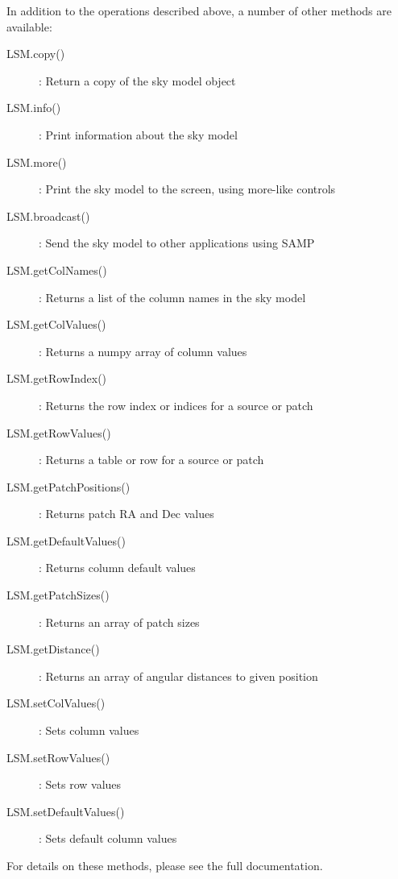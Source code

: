 \documentclass[structabstract]{article}
\begin{document}
In addition to the operations described above, a number of other methods are available:
\begin{description}
 \item[LSM.copy()]: Return a copy of the sky model object
 \item[LSM.info()]: Print information about the sky model
 \item[LSM.more()]: Print the sky model to the screen, using more-like controls
 \item[LSM.broadcast()]: Send the sky model to other applications using SAMP
 \item[LSM.getColNames()]: Returns a list of the column names in the sky model
 \item[LSM.getColValues()]: Returns a numpy array of column values
 \item[LSM.getRowIndex()]: Returns the row index or indices for a source or patch
 \item[LSM.getRowValues()]: Returns a table or row for a source or patch
 \item[LSM.getPatchPositions()]: Returns patch RA and Dec values
 \item[LSM.getDefaultValues()]: Returns column default values
 \item[LSM.getPatchSizes()]: Returns an array of patch sizes
 \item[LSM.getDistance()]: Returns an array of angular distances to given position
 \item[LSM.setColValues()]: Sets column values
 \item[LSM.setRowValues()]: Sets row values
 \item[LSM.setDefaultValues()]: Sets default column values
\end{description}
For details on these methods, please see the full documentation.
\end{document}
